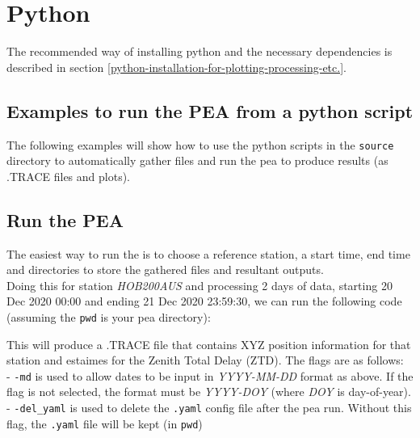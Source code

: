 
\chapter{Python}
The recommended way of installing python and the necessary dependencies is described in section \ref{python-installation-for-plotting-processing-etc.}.

\section{Examples to run the PEA from a python script}\label{examples-to-run-the-pea-from-a-python-script}

The following examples will show how to use the python scripts in the
\texttt{source} directory to automatically gather files and run the pea
to produce results (as .TRACE files and plots).

\section{Run the PEA}\label{run-the-pea}

The easiest way to run the is to choose a reference station, a start
time, end time and directories to store the gathered files and resultant
outputs.\\
Doing this for station \emph{HOB200AUS} and processing 2 days of data,
starting 20 Dec 2020 00:00 and ending 21 Dec 2020 23:59:30, we can run
the following code (assuming the \texttt{pwd} is your pea directory):


This will produce a .TRACE file that contains XYZ position information
for that station and estaimes for the Zenith Total Delay (ZTD). The
flags are as follows:\\
- \texttt{-md} is used to allow dates to be input in \emph{YYYY-MM-DD}
format as above. If the flag is not selected, the format must be
\emph{YYYY-DOY} (where \emph{DOY} is day-of-year).\\
- \texttt{-del\_yaml} is used to delete the \texttt{.yaml} config file
after the pea run. Without this flag, the \texttt{.yaml} file will be
kept (in \texttt{pwd})

